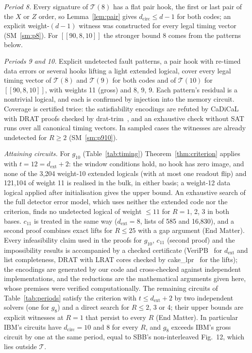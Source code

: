 \documentclass[aps,prl,twocolumn,superscriptaddress,nofootinbib]{revtex4-2}
\newif\ifshowclaimtags \showclaimtagsfalse
\newcommand{\cl}[1]{\ifshowclaimtags\textsuperscript{\textcolor{blue}{\scriptsize[#1]}}\fi}
\newcommand{\dcirc}{d_{\mathrm{circ}}}
\newcommand{\dext}{d_{\mathrm{ext}}}
\newcommand{\code}[1]{[[#1]]}
\newcommand{\T}{\mathcal{T}}
\begin{document}
\emph{Period 8.} Every signature of $\T(8)$ has a flat pair hook, the first or last pair
of the $X$ or $Z$ order, so Lemma~\ref{lem:pair} gives $\dcirc\le d-1$ for both codes; an
explicit weight-$(d-1)$ witness was constructed for every legal timing vector
(SM~\ref{sm:p8})\cl{L-12}. For $\code{90,8,10}$ the stronger bound 8 comes from the
patterns below.

\emph{Periods 9 and 10.} Explicit undetected fault patterns, a pair hook with re-timed data
errors or several hooks lifting a light extended logical, cover every legal timing vector
of $\T(8)$ and $\T(9)$ for both codes and of $\T(10)$ for $\code{90,8,10}$, with weights
11 (gross) and 8, 9, 9. Each pattern's residual is a nontrivial logical, and each is
confirmed by injection into the memory circuit. Coverage is certified twice: the
satisfiability encodings are refuted by CaDiCaL~\cite{CaDiCaL2024} with DRAT proofs checked
by drat-trim~\cite{DRATtrim2014}, and an
exhaustive check without SAT runs over all canonical timing vectors. In sampled cases the
witnesses are already undetected for $R\ge2$ (SM~\ref{sm:p910})\cl{L-2,L-15}.

\emph{Attaining circuits.} For $g_{10}$ (Table~\ref{tab:timing}) Theorem~\ref{thm:criterion}
applies with $t=12=\dext+2$: the window conditions hold, no hook has zero image, and none of
the 3,204 weight-10 extended logicals (with at most one readout flip) and 121,104 of weight
11 is realised in the bulk, in either basis; a weight-12 data logical applied after
initialisation gives the upper bound. An exhaustive search of the full detector error
model, which uses neither the extended code nor the criterion, finds no undetected logical
of weight $\le11$ for $R=1$, 2, 3 in both bases\cl{L-3}. $c_{11}$ is treated in the same way
($\dext=8$, lists of 585 and 16,830), and a second proof combines exact lifts for
$R\le25$ with a gap argument (End Matter)\cl{L-5}. Every infeasibility claim used in the
proofs for $g_{10}$, $c_{11}$ (second proof) and the impossibility results is accompanied by a checked
certificate (VeriPB~\cite{Bogaerts2023,GochtNordstrom2021} for $\dext$ and list
completeness, DRAT with LRAT cores checked by cake\_lpr~\cite{Tan2021cakelpr} for the lifts); the encodings are generated by our code and cross-checked against
independent implementations, and the reductions are the mathematical arguments given here,
whose premises were verified computationally\cl{L-15}. The remaining circuits of
Table~\ref{tab:periods} satisfy the criterion with $t\le\dext+2$ by two independent solvers
(one for $g_8$) and a direct search for $R\le2$, 3 or 4; their upper bounds are explicit witnesses at $R=1$ that
persist to every $R$ (End Matter)\cl{L-4,L-6,L-7,L-23}. In particular IBM's circuits have
$\dcirc=10$ and 8 for every $R$, and $g_8$ exceeds IBM's gross circuit by one at the same period, equal to
SBB's non-interleaved Fig.~12, which lies outside $\T$\cl{L-8}.
\end{document}
